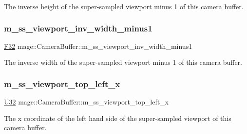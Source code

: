 The inverse height of the super-\/sampled viewport minus 1 of this camera buffer. \hypertarget{structmage_1_1_camera_buffer_ad881a3acbf1eed761374a50296e35e47}{}\label{structmage_1_1_camera_buffer_ad881a3acbf1eed761374a50296e35e47} 
\subsubsection{\texorpdfstring{m\+\_\+ss\+\_\+viewport\+\_\+inv\+\_\+width\+\_\+minus1}{m\_ss\_viewport\_inv\_width\_minus1}}
{\footnotesize\ttfamily \hyperlink{namespacemage_aa97e833b45f06d60a0a9c4fc22ae02c0}{F32} mage\+::\+Camera\+Buffer\+::m\+\_\+ss\+\_\+viewport\+\_\+inv\+\_\+width\+\_\+minus1}

The inverse width of the super-\/sampled viewport minus 1 of this camera buffer. \hypertarget{structmage_1_1_camera_buffer_a0584c712968ff83e6b22fa0ad83e0da5}{}\label{structmage_1_1_camera_buffer_a0584c712968ff83e6b22fa0ad83e0da5} 
\subsubsection{\texorpdfstring{m\+\_\+ss\+\_\+viewport\+\_\+top\+\_\+left\+\_\+x}{m\_ss\_viewport\_top\_left\_x}}
{\footnotesize\ttfamily \hyperlink{namespacemage_a41c104c036fba3756a74e19f793eeaa1}{U32} mage\+::\+Camera\+Buffer\+::m\+\_\+ss\+\_\+viewport\+\_\+top\+\_\+left\+\_\+x}

The x coordinate of the left hand side of the super-\/sampled viewport of this camera buffer. \hypertarget{structmage_1_1_camera_buffer_ac6c5a7af84cef485dd9ddacd018e4a82}{}\label{structmage_1_1_camera_buffer_ac6c5a7af84cef485dd9ddacd018e4a82} 
